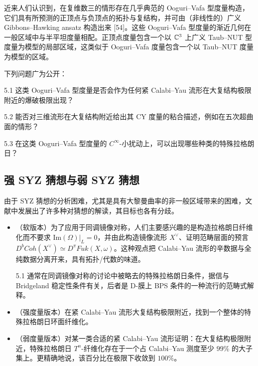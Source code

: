 
近来人们认识到，在复维数三的情形存在几乎典范的 Ooguri--Vafa 型度量构造，它们具有所预测的正顶点与负顶点的拓扑与复结构，并可由（非线性的）广义 Gibbons--Hawking ansatz 构造出来 [54]。这些 Ooguri--Vafa 型度量的渐近几何在一般区域中与半平坦度量相配。正顶点度量包含一个以 $\mathbb{C}^3$ 上广义 Taub--NUT 型度量为模型的局部区域，这类似于 Ooguri--Vafa 度量包含一个以 Taub--NUT 度量为模型的区域。

下列问题广为公开：

\begin{question}{5.1}
这类 Ooguri--Vafa 型度量是否会作为任何紧 Calabi--Yau 流形在大复结构极限附近的爆破极限出现？
\end{question}

\begin{question}{5.2}
能否对三维流形在大复结构附近给出其 CY 度量的粘合描述，例如在五次超曲面的情形？
\end{question}

\begin{question}{5.3}
在这类 Ooguri--Vafa 型度量的 $C^\infty$-小扰动上，可以出现哪些种类的特殊拉格朗日？
\end{question}


\subsection{强 SYZ 猜想与弱 SYZ 猜想}

由于 SYZ 猜想的分析困难，尤其是具有大黎曼曲率的非一般区域带来的困难，文献中发展出了许多种对猜想的解读，其目标也各有分歧。

\begin{itemize}
\item （软版本）为了应用于同调镜像对称，人们主要感兴趣的是构造拉格朗日纤维化而不要求 $\mathrm{Im}(\Omega)|_L=0$，并由此构造镜像流形 $X^\vee$、证明范畴层面的预言 $D^bCoh(X^\vee)\simeq D^\pi Fuk(X,\omega)$。这种观点把 Calabi--Yau 流形的辛数据与全纯数据分离开来，具有拓扑/代数的味道。

\begin{remark}{5.1}
通常在同调镜像对称的讨论中被略去的特殊拉格朗日条件，据信与 Bridgeland 稳定性条件有关，后者是 D-膜上 BPS 条件的一种流行的范畴式解释。
\end{remark}

\item （强度量版本）在紧 Calabi--Yau 流形大复结构极限附近，找到一个整体的特殊拉格朗日环面纤维化。
\item （弱度量版本）对某一类合适的紧 Calabi--Yau 流形证明：在大复结构极限附近，特殊拉格朗日 $T^n$-纤维化存在于一个占 Calabi--Yau 测度至少 $99\%$ 的大子集上。更精确地说，该百分比在极限下收敛到 $100\%$。
\end{itemize}

